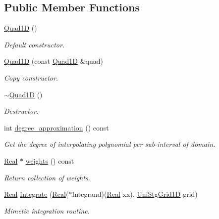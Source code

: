\subsection*{Public Member Functions}
\begin{DoxyCompactItemize}
\item 
\hyperlink{classmtk_1_1Quad1D_ada5a2f1e7c92dbf1f85c61ecd0d173ec}{Quad1\-D} ()
\begin{DoxyCompactList}\small\item\em Default constructor. \end{DoxyCompactList}\item 
\hyperlink{classmtk_1_1Quad1D_ac4334daf0614bd4c789600c885b6116d}{Quad1\-D} (const \hyperlink{classmtk_1_1Quad1D}{Quad1\-D} \&quad)
\begin{DoxyCompactList}\small\item\em Copy constructor. \end{DoxyCompactList}\item 
\hyperlink{classmtk_1_1Quad1D_ae3de223d0841c9602feb4ea8b305a373}{$\sim$\-Quad1\-D} ()
\begin{DoxyCompactList}\small\item\em Destructor. \end{DoxyCompactList}\item 
int \hyperlink{classmtk_1_1Quad1D_aa1d1fe5f7cdaf8bf923a11c7d3d2468f}{degree\-\_\-approximation} () const 
\begin{DoxyCompactList}\small\item\em Get the degree of interpolating polynomial per sub-\/interval of domain. \end{DoxyCompactList}\item 
\hyperlink{group__c01-roots_gac080bbbf5cbb5502c9f00405f894857d}{Real} $\ast$ \hyperlink{classmtk_1_1Quad1D_aefd1ca6b381e1428b3d163ed650f79c4}{weights} () const 
\begin{DoxyCompactList}\small\item\em Return collection of weights. \end{DoxyCompactList}\item 
\hyperlink{group__c01-roots_gac080bbbf5cbb5502c9f00405f894857d}{Real} \hyperlink{classmtk_1_1Quad1D_a89b5340ed484e5d36a569b1d17300cc8}{Integrate} (\hyperlink{group__c01-roots_gac080bbbf5cbb5502c9f00405f894857d}{Real}($\ast$Integrand)(\hyperlink{group__c01-roots_gac080bbbf5cbb5502c9f00405f894857d}{Real} xx), \hyperlink{classmtk_1_1UniStgGrid1D}{Uni\-Stg\-Grid1\-D} grid)
\begin{DoxyCompactList}\small\item\em Mimetic integration routine. \end{DoxyCompactList}\end{DoxyCompactItemize}
